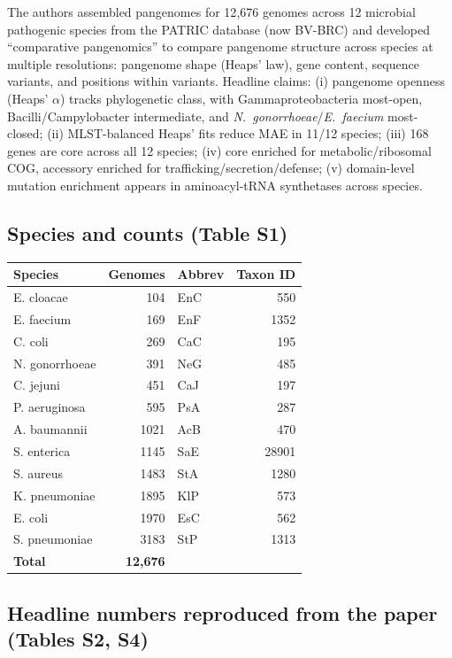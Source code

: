 \documentclass[11pt,a4paper]{article}
\begin{document}
The authors assembled pangenomes for 12{,}676 genomes across 12 microbial pathogenic species from the PATRIC database (now BV-BRC) and developed ``comparative pangenomics'' to compare pangenome structure across species at multiple resolutions: pangenome shape (Heaps' law), gene content, sequence variants, and positions within variants. Headline claims: (i) pangenome openness (Heaps' $\alpha$) tracks phylogenetic class, with Gammaproteobacteria most-open, Bacilli/Campylobacter intermediate, and \textit{N.\ gonorrhoeae}/\textit{E.\ faecium} most-closed; (ii) MLST-balanced Heaps' fits reduce MAE in 11/12 species; (iii) 168 genes are core across all 12 species; (iv) core enriched for metabolic/ribosomal COG, accessory enriched for trafficking/secretion/defense; (v) domain-level mutation enrichment appears in aminoacyl-tRNA synthetases across species.

\subsection{Species and counts (Table S1)}

\begin{center}
\begin{tabular}{lrlr}
\toprule
Species & Genomes & Abbrev & Taxon ID\\
\midrule
E. cloacae      & 104 & EnC & 550   \\
E. faecium      & 169 & EnF & 1352  \\
C. coli         & 269 & CaC & 195   \\
N. gonorrhoeae  & 391 & NeG & 485   \\
C. jejuni       & 451 & CaJ & 197   \\
P. aeruginosa   & 595 & PsA & 287   \\
A. baumannii    & 1021 & AcB & 470  \\
S. enterica     & 1145 & SaE & 28901\\
S. aureus       & 1483 & StA & 1280 \\
K. pneumoniae   & 1895 & KlP & 573  \\
E. coli         & 1970 & EsC & 562  \\
S. pneumoniae   & 3183 & StP & 1313 \\
\midrule
\textbf{Total} & \textbf{12{,}676} & & \\
\bottomrule
\end{tabular}
\end{center}

\subsection{Headline numbers reproduced from the paper (Tables S2, S4)}
\end{document}
